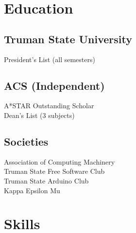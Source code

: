 \documentclass[letterpaper]{deedy-resume} %
\begin{document}
\begin{minipage}[t]{0.33\textwidth} %


\section{Education} 

\subsection{Truman State University}

President's List (all semesters) \\
\sectionspace %

\subsection{ACS (Independent)}
A*STAR Outstanding Scholar \\
Dean's List (3 subjects) \\
\sectionspace %

\subsection{Societies}
Association of Computing Machinery \\
Truman State Free Software Club \\
Truman State Arduino Club \\
Kappa Epsilon Mu

\sectionspace %

\section{Skills}


\end{minipage}
\end{document}
